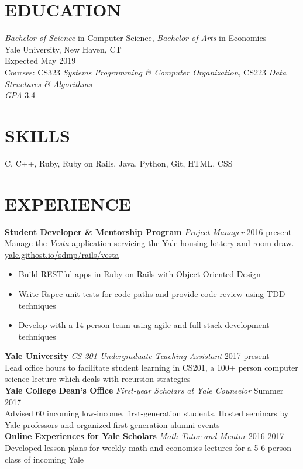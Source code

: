 \documentclass[margin, centered]{res}
\begin{document}
\address{\href{mailto:melina.delgado@yale.edu}{melina.delgado@yale.edu} | \href{http://melinadelgado.com}{melinadelgado.com} \\ 130 Prospect St, New Haven, CT 06511 | (954) 682-8999}

\begin{resume}
  \section{EDUCATION}
  \textit{Bachelor of Science} in Computer Science, \textit{Bachelor of Arts} in Economics \\
  Yale University, New Haven, CT \\
  Expected May 2019 \\
  Courses: CS323 \textit{Systems Programming \& Computer Organization}, CS223 \textit{Data Structures \& Algorithms} \\ 
  \textit{GPA} 3.4

  \section{SKILLS}
  C, C++, Ruby, Ruby on Rails, Java, Python, Git, HTML, CSS
  

  \section{EXPERIENCE}
  \textbf{Student Developer \&  Mentorship Program} \textit{Project Manager} \hfill 2016-present \\
  Manage the \textit{Vesta} application servicing the Yale housing lottery and room draw. \\ 
  \href{https://yale.githost.io/sdmp/rails/vesta}{yale.githost.io/sdmp/rails/vesta}\smallskip{}
  \begin{itemize}
    \item Build RESTful apps in Ruby on Rails with Object-Oriented Design
    \item Write Rspec unit tests for code paths and provide code review using TDD techniques
    \item Develop with a 14-person team using agile and full-stack development techniques
  \end{itemize}
  \textbf{Yale University} \textit{CS 201 Undergraduate Teaching Assistant} \hfill 2017-present \\
  Lead office hours to facilitate student learning in CS201, a 100+ person computer science lecture which deals with recursion strategies \\ 
  \textbf{Yale College Dean's Office} \textit{First-year Scholars at Yale Counselor} \hfill Summer 2017 \\
  Advised 60 incoming low-income, first-generation students. Hosted seminars by Yale professors and organized first-generation alumni events \\
  \textbf{Online Experiences for Yale Scholars} \textit{Math Tutor and Mentor} \hfill 2016-2017 \\
  Developed lesson plans for weekly math and economics lectures for a 5-6 person class of incoming Yale 


\end{resume}
\end{document}
